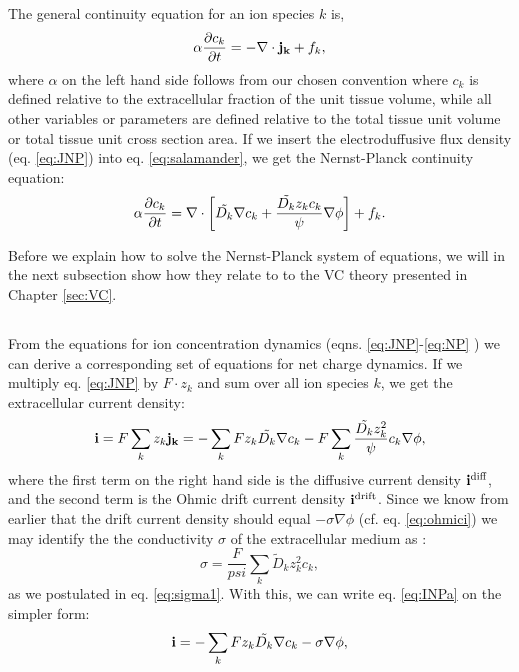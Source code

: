 The general continuity equation for an ion species $k$ is,
\begin{equation}
\alpha \frac{\partial c_k}{\partial t} = - \nabla \cdot {\bf j_k} + f_k,
\label{eq:salamander}
\end{equation}
where $\alpha$ on the left hand side follows from our chosen convention where $c_k$ is defined relative to the extracellular fraction of the unit tissue volume, while all other variables or parameters are defined relative to the total tissue unit volume or total tissue unit cross section area. If we insert the electroduffusive flux density (eq. \ref{eq:JNP}) into eq. \ref{eq:salamander},
we get the Nernst-Planck continuity equation:
\begin{equation}
\alpha \frac{\partial c_k}{\partial t} = {\bf \nabla} \cdot \left[ \tilde{D_k} {\bf \nabla} c_k + \frac{\tilde{D_k} z_k c_k}{\psi} {\bf \nabla} \phi \right] + f_k.
\label{eq:NP}
\end{equation}

Before we explain how to solve the Nernst-Planck system of equations, we will in the next subsection show how they relate to to the VC theory presented in Chapter \ref{sec:VC}.


\subsection{}
From the equations for ion concentration dynamics (eqns. \ref{eq:JNP}-\ref{eq:NP} ) we can derive a corresponding set of equations for net charge dynamics. If we multiply eq. \ref{eq:JNP} by $F\cdot z_k$ and sum over all ion species $k$, we get the extracellular current density:
\begin{equation}
{\bf i} = F\sum_k {z_k {\bf j_k}} = -\sum_k{F z_k \tilde{D_k}{\bf \nabla} c_{k}} - F\sum_{k} \frac{\tilde{D_k} z_{k}^2}{\psi}c_{k} {\bf \nabla}{\phi}, 
\label{eq:INPa}
\end{equation}
where the first term on the right hand side is the diffusive current density ${\bf i^\text{diff}}$, and the second term is the Ohmic drift current density ${\bf i^\text{drift}}$. Since we know from earlier that the drift current density should equal $- \sigma \nabla \phi$  (cf. eq. \ref{eq:ohmici}) we may identify the the conductivity $\sigma$ of the extracellular medium as \citep{Koch1999}:
\begin{equation}
\sigma = \frac{F}{psi}\sum_{k} \tilde{D}_k z_{k}^2 c_{k},
\label{eq:sigma}
\end{equation}
as we postulated in eq. \ref{eq:sigma1}. With this, we can write eq. \ref{eq:INPa} on the simpler form:
\begin{equation}
{\bf i} = - \sum_k{F z_k \tilde{D_k}{\bf \nabla} c_{k}} - \sigma{\bf \nabla}{\phi},
\label{eq:INP}
\end{equation}

